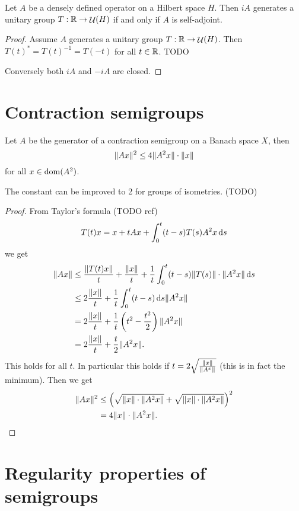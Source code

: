 \begin{theorem}
Let $A$ be a densely defined operator on a Hilbert space $H$. Then $iA$ generates a unitary group $T: \mathbb{R} \to \mathop{\mathcal{U}}\nolimits(H)$ \textup{if and only if} $A$ is self-adjoint.
\end{theorem}
\begin{proof}
Assume $A$ generates a unitary group $T: \mathbb{R} \to \mathop{\mathcal{U}}\nolimits(H)$. Then $T(t)^* = T(t)^{-1} = T(-t)$ for all $t\in \mathbb{R}$. TODO

Conversely both $iA$ and $-iA$ are closed.
\end{proof}

\section{Contraction semigroups}

\begin{proposition}
Let $A$ be the generator of a contraction semigroup on a Banach space $X$, then
\[ \lVert Ax\rVert^2 \leq 4 \lVert A^2x\rVert\cdot\lVert x\rVert \]
for all $x\in\operatorname{dom}(A^2)$.
\end{proposition}
The constant can be improved to 2 for groups of isometries. (TODO)
\begin{proof}
From Taylor's formula (TODO ref)
\[ T(t)x = x + tAx + \int_0^t(t-s)T(s)A^2x \operatorname{d \!}{s} \]
we get
\begin{align*}
\lVert Ax\rVert &\leq \frac{\lVert T(t)x\rVert}{t} + \frac{\lVert x\rVert}{t} + \frac{1}{t}\int_0^t(t-s)\lVert T(s)\rVert\cdot\lVert A^2x\rVert\operatorname{d \!}{s} \\
&\leq 2\frac{\lVert x\rVert}{t} + \frac{1}{t}\int_0^t(t-s)\operatorname{d \!}{s}\lVert A^2x\rVert \\
&= 2\frac{\lVert x\rVert}{t} + \frac{1}{t}\left(t^2 - \frac{t^2}{2}\right)\lVert A^2x\rVert \\
&= 2\frac{\lVert x\rVert}{t} + \frac{t}{2}\lVert A^2x\rVert.
\end{align*}
This holds for all $t$. In particular this holds if $t = 2\sqrt{\frac{\lVert x\rVert}{\lVert A^x\rVert}}$ (this is in fact the minimum). Then we get
\begin{align*}
\lVert Ax\rVert^2 &\leq \left(\sqrt{\lVert x\rVert\cdot\lVert A^2x\rVert} + \sqrt{\lVert x\rVert\cdot\lVert A^2x\rVert}\right)^2 \\
&= 4\lVert x\rVert\cdot\lVert A^2x\rVert.
\end{align*}
\end{proof}

\section{Regularity properties of semigroups}
